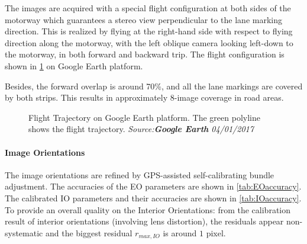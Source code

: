 \clearpage

The images are acquired with a special flight configuration at both sides of the motorway which guarantees a stereo view perpendicular to the lane marking direction. This is realized by flying at the right-hand side with respect to flying direction along the motorway, with the left oblique camera looking left-down to the motorway, in both forward and backward trip. The flight configuration is shown in \cref{fig:FlightTrajectory} on Google Earth platform.

Besides, the forward overlap is around 70\%, and all the lane markings are covered by both strips. This results in approximately 8-image coverage in road areas.

\begin{figure}%
  \centering
  \caption{Flight Trajectory on Google Earth platform. The green polyline shows the flight trajectory. \textit{Source:\textbf{Google Earth} 04/01/2017}}
  \label{fig:FlightTrajectory}
\end{figure}


\paragraph{Image Orientations}
The image orientations are refined by GPS-assisted self-calibrating bundle adjustment. The accuracies of the EO parameters are shown in \cref{tab:EOaccuracy}. The calibrated IO parameters and their accuracies are shown in \cref{tab:IOaccuracy}. To provide an overall quality on the Interior Orientations: from the calibration result of interior orientations (involving lens distortion), the residuals appear non-systematic and the biggest residual $r_{max, IO}$ is around $1$ pixel.
\clearpage %

